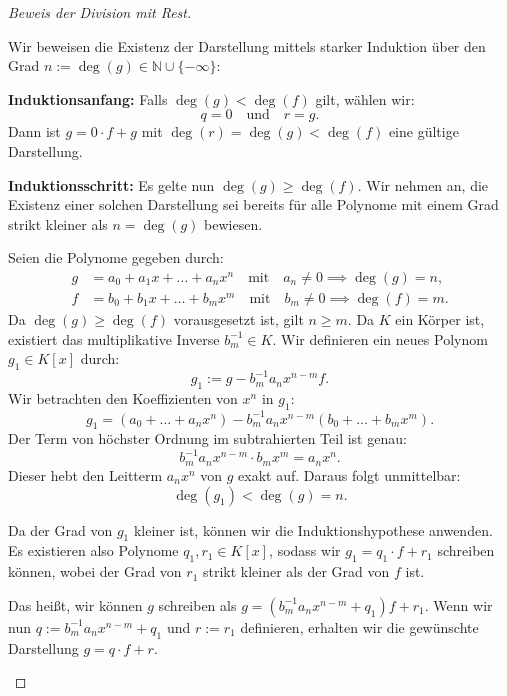\begin{proof}[Beweis der Division mit Rest]
\begin{math-stroke}[Existenzbeweis]
Wir beweisen die Existenz der Darstellung mittels starker Induktion über den Grad $n := \deg(g) \in \mathbb{N} \cup \{-\infty\}$:

\textbf{Induktionsanfang:}
Falls $\deg(g) < \deg(f)$ gilt, wählen wir:
\[
q = 0 \quad \text{und} \quad r = g.
\]
Dann ist $g = 0 \cdot f + g$ mit $\deg(r) = \deg(g) < \deg(f)$ eine gültige Darstellung.

\textbf{Induktionsschritt:}
Es gelte nun $\deg(g) \ge \deg(f)$. Wir nehmen an, die Existenz einer solchen Darstellung sei bereits für alle Polynome mit einem Grad strikt kleiner als $n = \deg(g)$ bewiesen.

Seien die Polynome gegeben durch:
\begin{align*}
g &= a_0 + a_1 x + \dots + a_n x^n \quad \text{mit} \quad a_n \neq 0 \implies \deg(g) = n, \\
f &= b_0 + b_1 x + \dots + b_m x^m \quad \text{mit} \quad b_m \neq 0 \implies \deg(f) = m.
\end{align*}
Da $\deg(g) \ge \deg(f)$ vorausgesetzt ist, gilt $n \ge m$. Da $K$ ein Körper ist, existiert das multiplikative Inverse $b_m^{-1} \in K$. Wir definieren ein neues Polynom $g_1 \in K[x]$ durch:
\begin{equation}\label{eq:g1-definition}
g_1 := g - b_m^{-1} a_n x^{n-m} f.
\end{equation}
Wir betrachten den Koeffizienten von $x^n$ in $g_1$:
\[
g_1 = \left( a_0 + \dots + a_n x^n \right) - b_m^{-1} a_n x^{n-m} \left( b_0 + \dots + b_m x^m \right).
\]
Der Term von höchster Ordnung im subtrahierten Teil ist genau:
\[
b_m^{-1} a_n x^{n-m} \cdot b_m x^m = a_n x^n.
\]
Dieser hebt den Leitterm $a_n x^n$ von $g$ exakt auf. Daraus folgt unmittelbar:
\[
\deg(g_1) < \deg(g) = n.
\]
\end{math-stroke}

\begin{spoken-clean}[00:28:00 - 00:28:47]
Da der Grad von $g_1$ kleiner ist, können wir die Induktionshypothese anwenden. Es existieren also Polynome $q_1, r_1 \in K[x]$, sodass wir $g_1 = q_1 \cdot f + r_1$ schreiben können, wobei der Grad von $r_1$ strikt kleiner als der Grad von $f$ ist. 

Das heißt, wir können $g$ schreiben als $g = (b_m^{-1} a_n x^{n-m} + q_1) f + r_1$. Wenn wir nun $q := b_m^{-1} a_n x^{n-m} + q_1$ und $r := r_1$ definieren, erhalten wir die gewünschte Darstellung $g = q \cdot f + r$. 


\end{spoken-clean}
\end{proof}

